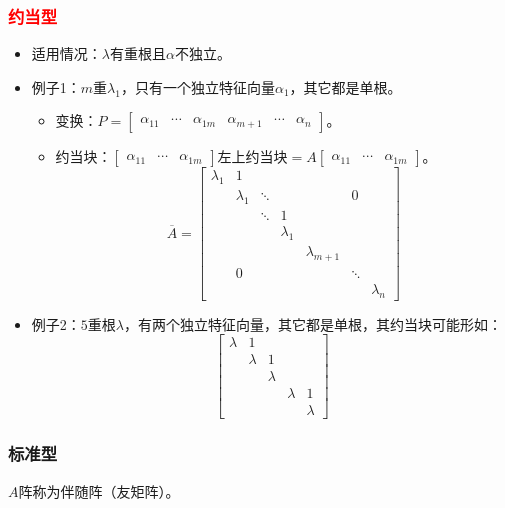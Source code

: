\documentclass[
12pt, %
a4paper, 
oneside, %
]{scrartcl}
\begin{document}
\subsubsection[约当型]{\textcolor{red}{约当型}}
\begin{itemize}
\item 适用情况：$ \lambda $有重根且$ \alpha $不独立。
\item 例子1：$ m $重$ \lambda_1 $，只有一个独立特征向量$ \alpha_1 $，其它都是单根。
\begin{itemize}
\item 变换：$ P = \begin{bmatrix} \alpha_{11} & \cdots & \alpha_{1m} & \alpha_{m + 1} & \cdots & \alpha_n \end{bmatrix} $。
\item 约当块：$ \begin{bmatrix} \alpha_{11} & \cdots & \alpha_{1m} \end{bmatrix} $左上约当块$ = A \begin{bmatrix} \alpha_{11} & \cdots & \alpha_{1m} \end{bmatrix} $。
$$ \overline{A} = \begin{bmatrix} \lambda_1 & 1 & & & & & \\ & \lambda_1 & \ddots & & & 0 & \\ & & \ddots & 1 & & & \\ & & & \lambda_1 & & & \\ & & & & \lambda_{m + 1} & & \\ & 0 & & & & \ddots & \\ & & & & & & \lambda_n \end{bmatrix} $$
\end{itemize}
\item 例子2：$ 5 $重根$ \lambda $，有两个独立特征向量，其它都是单根，其约当块可能形如：
$$ \begin{bmatrix} \lambda & 1 & & & \\ & \lambda & 1 & & \\ & & \lambda & & \\ & & & \lambda & 1 \\ & & & & \lambda \end{bmatrix} $$
\end{itemize}
\subsubsection[标准型]{标准型}
$ A $阵称为伴随阵（友矩阵）。
\end{document}
